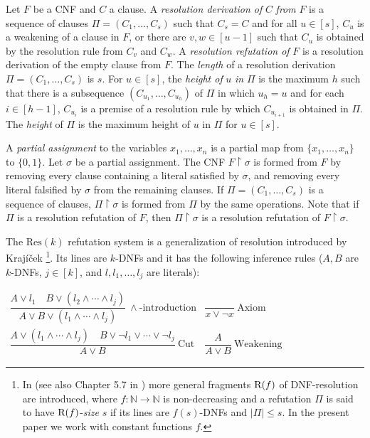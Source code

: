 \documentclass[10pt,a4paper]{article}
\theoremstyle{remark}
\newtheorem*{switching lemma}{Switching Lemma}
\newtheorem*{open problem}{Open Problem}
\theoremstyle{definition}
\begin{document}
Let $F$ be a CNF and $C$ a clause. A \emph{resolution derivation of} $C$ \emph{from} $F$ is a sequence of clauses $\Pi = (C_1, \ldots , C_s)$ such that $C_s = C$ and for all $u \in [s]$, $C_u$ is a weakening of a clause in $F$, or there are $v,w \in [u-1]$ such that $C_u$ is obtained by the resolution rule from $C_v$ and $C_w$. 
A \emph{resolution refutation of} $F$ is a resolution derivation of the empty clause from $F$.
The \emph{length} of a resolution derivation $\Pi = (C_1, \ldots , C_s)$ is $s$. 
For $u \in [s]$, the \emph{height of} $u$ \emph{in} $\Pi$ is the maximum $h$ such that there is a subsequence $(C_{u_1}, \ldots , C_{u_h})$ of $\Pi$ in which $u_h = u$ and for each $i \in [h-1]$, $C_{u_i}$ is a premise of a resolution rule by which $C_{u_{i+1}}$ is obtained in $\Pi$. 
The \emph{height} of $\Pi$ is the maximum height of $u$ in $\Pi$ for $u \in [s]$. 

 
A \emph{partial assignment} to the variables $x_1, \ldots , x_n$ is a partial map from $\{ x_1, \ldots , x_n \}$ to $\{0,1\}$. Let $\sigma$ be a partial assignment. The CNF $F \! \restriction \! \sigma$ is formed from $F$ by removing every clause containing a literal satisfied by $\sigma$, and removing every literal falsified by $\sigma$ from the remaining clauses. If $\Pi = (C_1, \ldots , C_s)$ is a sequence of clauses, $\Pi \!\restriction \! \sigma$ is formed from $\Pi$ by the same operations. Note that if $\Pi$ is a resolution refutation of $F$, then $\Pi \!\restriction \! \sigma$ is a resolution refutation of $F \!\restriction \! \sigma$. 

The $\text{Res}(k)$ refutation system is a generalization of resolution introduced by Kraj\'{i}\v{c}ek \cite{Krajicek2001}\footnote{In \cite{Krajicek2001} (see also Chapter 5.7 in \cite{Krajicek2019-book}) more general fragments $\textnormal{R}(f)$ of DNF-resolution are introduced, where $f:\mathbb{N} \rightarrow \mathbb{N}$ is non-decreasing and a refutation $\Pi$ is said to have $\textnormal{R}(f)$-\emph{size} $s$ if its lines are $f(s)$-DNFs and $|\Pi| \leq s$. In the present paper we work with constant functions $f$.}. 
Its lines are $k$-DNFs and it has the following inference rules ($A,B$ are $k$-DNFs, $j \in [k]$, and $l,l_1,\ldots, l_j$ are literals):
\begingroup
\renewcommand{\arraystretch}{2.5}
\begin{center}
$\begin{array}{cc}
\dfrac{A\lor l_1\quad B\lor(l_2\land\cdots\land l_j)}{A\lor B\lor(l_1\land\cdots\land l_j)}\ \land\text{-introduction}
&\dfrac{}{x\lor\neg x}\ \text{Axiom}\\
\dfrac{A\lor(l_1\land\cdots\land l_j)\quad B\lor\neg l_1\lor\cdots\lor\neg l_j}{A\lor B}\ \text{Cut}
&\dfrac{A}{A\lor B}\ \text{Weakening}
\end{array}$
\end{center}
\endgroup
\end{document}
